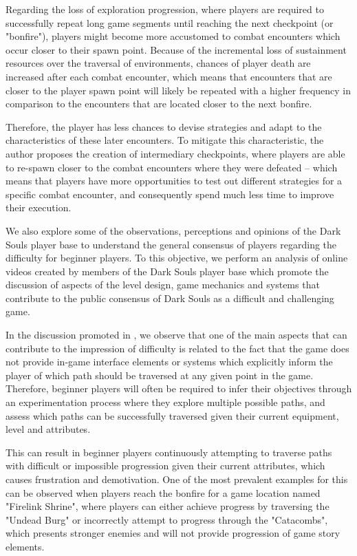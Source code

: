 Regarding the loss of exploration progression, where players are required to successfully repeat long game segments until reaching the next checkpoint (or "bonfire"), players might become more accustomed to combat encounters which occur closer to their spawn point. Because of the incremental loss of sustainment resources over the traversal of environments, chances of player death are increased after each combat encounter, which means that encounters that are closer to the player spawn point will likely be repeated with a higher frequency in comparison to the encounters that are located closer to the next bonfire.

Therefore, the player has less chances to devise strategies and adapt to the characteristics of these later encounters. To mitigate this characteristic, the author proposes the creation of intermediary checkpoints, where players are able to re-spawn closer to the combat encounters where they were defeated -- which means that players have more opportunities to test out different strategies for a specific combat encounter, and consequently spend much less time to improve their execution.

We also explore some of the observations, perceptions and opinions of the Dark Souls player base to understand the general consensus of players regarding the difficulty for beginner players. To this objective, we perform an analysis of online videos created by members of the Dark Souls player base which promote the discussion of aspects of the level design, game mechanics and systems that contribute to the public consensus of Dark Souls as a difficult and challenging game.

In the discussion promoted in \citet{YT_HowChallengingIsDarkSouls}, we observe that one of the main aspects that can contribute to the impression of difficulty is related to the fact that the game does not provide in-game interface elements or systems which explicitly inform the player of which path should be traversed at any given point in the game. Therefore, beginner players will often be required to infer their objectives through an experimentation process where they explore multiple possible paths, and assess which paths can be successfully traversed given their current equipment, level and attributes.

This can result in beginner players continuously attempting to traverse paths with difficult or impossible progression given their current attributes, which causes frustration and demotivation. One of the most prevalent examples for this can be observed when players reach the bonfire for a game location named "Firelink Shrine", where players can either achieve progress by traversing the "Undead Burg" or incorrectly attempt to progress through the "Catacombs", which presents stronger enemies and will not provide progression of game story elements.

